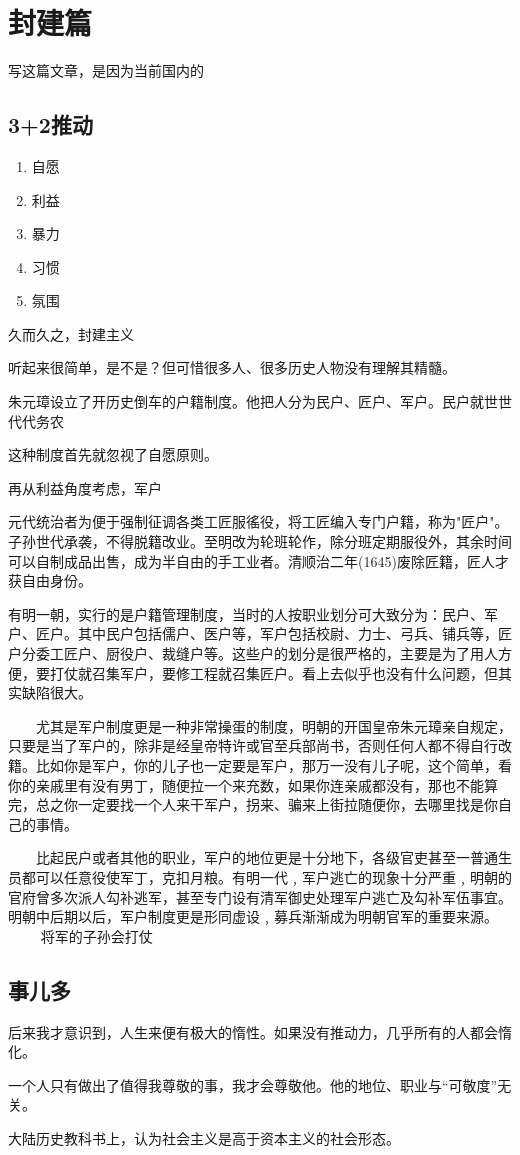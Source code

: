 \chapter{封建篇}

写这篇文章，是因为当前国内的



\section{3+2推动}

\begin{enumerate}
\item 自愿
\item 利益
\item 暴力
\item 习惯
\item 氛围 
\end{enumerate}

久而久之，封建主义

听起来很简单，是不是？但可惜很多人、很多历史人物没有理解其精髓。

朱元璋设立了开历史倒车的户籍制度。他把人分为民户、匠户、军户。民户就世世代代务农

这种制度首先就忽视了自愿原则。

再从利益角度考虑，军户



元代统治者为便于强制征调各类工匠服徭役，将工匠编入专门户籍，称为"匠户"。子孙世代承袭，不得脱籍改业。至明改为轮班轮作，除分班定期服役外，其余时间可以自制成品出售，成为半自由的手工业者。清顺治二年(1645)废除匠籍，匠人才获自由身份。

有明一朝，实行的是户籍管理制度，当时的人按职业划分可大致分为：民户、军户、匠户。其中民户包括儒户、医户等，军户包括校尉、力士、弓兵、铺兵等，匠户分委工匠户、厨役户、裁缝户等。这些户的划分是很严格的，主要是为了用人方便，要打仗就召集军户，要修工程就召集匠户。看上去似乎也没有什么问题，但其实缺陷很大。

　　尤其是军户制度更是一种非常操蛋的制度，明朝的开国皇帝朱元璋亲自规定，只要是当了军户的，除非是经皇帝特许或官至兵部尚书，否则任何人都不得自行改籍。比如你是军户，你的儿子也一定要是军户，那万一没有儿子呢，这个简单，看你的亲戚里有没有男丁，随便拉一个来充数，如果你连亲戚都没有，那也不能算完，总之你一定要找一个人来干军户，拐来、骗来上街拉随便你，去哪里找是你自己的事情。

　　比起民户或者其他的职业，军户的地位更是十分地下，各级官吏甚至一普通生员都可以任意役使军丁，克扣月粮。有明一代﹐军户逃亡的现象十分严重﹐明朝的官府曾多次派人勾补逃军，甚至专门设有清军御史处理军户逃亡及勾补军伍事宜。明朝中后期以后，军户制度更是形同虚设﹐募兵渐渐成为明朝官军的重要来源。
　　
将军的子孙会打仗　

\section{事儿多}

后来我才意识到，人生来便有极大的惰性。如果没有推动力，几乎所有的人都会惰化。

一个人只有做出了值得我尊敬的事，我才会尊敬他。他的地位、职业与“可敬度”无关。

大陆历史教科书上，认为社会主义是高于资本主义的社会形态。

